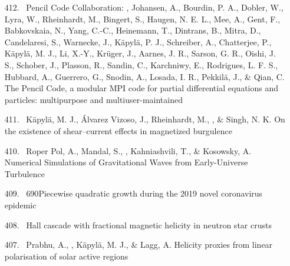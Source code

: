 \begin{itemize}
\item[{412.}~]
Pencil Code Collaboration: \Brandenburg, Johansen, A., Bourdin, P. A., Dobler, W., Lyra, W., Rheinhardt, M., Bingert, S., Haugen, N. E. L., Mee, A., Gent, F., Babkovskaia, N., Yang, C.-C., Heinemann, T., Dintrans, B., Mitra, D., Candelaresi, S., Warnecke, J., K\"apyl\"a, P. J., Schreiber, A., Chatterjee, P., K\"apyl\"a, M. J., Li, X.-Y., Kr\"uger, J., Aarnes, J. R., Sarson, G. R., Oishi, J. S., Schober, J., Plasson, R., Sandin, C., Karchniwy, E., Rodrigues, L. F. S., Hubbard, A., Guerrero, G., Snodin, A., Losada, I. R., Pekkil\"a, J., \& Qian, C.
{The Pencil Code, a modular MPI code for partial differential equations and particles: multipurpose and multiuser-maintained}

\item[{411.}~]
K\"apyl\"a, M. J., \'Alvarez Vizoso, J., Rheinhardt, M., \Brandenburg, \& Singh, N. K.
{On the existence of shear--current effects in magnetized burgulence}

\item[{410.}~]
Roper Pol, A., Mandal, S., \Brandenburg, Kahniashvili, T., \& Kosowsky, A.
{Numerical Simulations of Gravitational Waves from Early-Universe Turbulence}

\item[{409.}~]
\Brandenburg{}
{690}{Piecewise quadratic growth during the 2019 novel coronavirus epidemic}

\item[{408.}~]
\Brandenburg{}
{Hall cascade with fractional magnetic helicity in neutron star crusts}

\item[{407.}~]
Prabhu, A., \Brandenburg, K\"apyl\"a, M. J., \& Lagg, A.
{Helicity proxies from linear polarisation of solar active regions}


\end{itemize}
